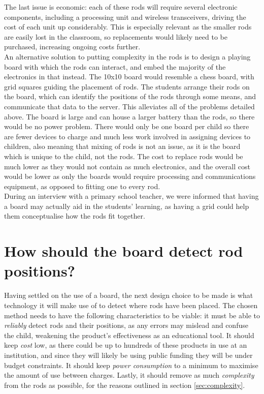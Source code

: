 The last issue is economic: each of these rods will require several electronic components, including a processing unit and wireless transceivers, driving the cost of each unit up considerably. This is especially relevant as the smaller rods are easily lost in the classroom, so replacements would likely need to be purchased, increasing ongoing costs further.\\

An alternative solution to putting complexity in the rods is to design a playing board with which the rods can interact, and embed the majority of the electronics in that instead. The 10x10 board would resemble a chess board, with grid squares guiding the placement of rods. The students arrange their rods on the board, which can identify the positions of the rods through some means, and communicate that data to the server. This alleviates all of the problems detailed above. The board is large and can house a larger battery than the rods, so there would be no power problem. There would only be one board per child so there are fewer devices to charge and much less work involved in assigning devices to children, also meaning that mixing of rods is not an issue, as it is the board which is unique to the child, not the rods. The cost to replace rods would be much lower as they would not contain as much electronics, and the overall cost would be lower as only the boards would require processing and communications equipment, as opposed to fitting one to every rod.\\ 

During an interview with a primary school teacher, we were informed that having a board may actually aid in the students’ learning, as having a grid could help them conceptualise how the rods fit together. 

\section{How should the board detect rod positions?}
\label{sec:detection}  


Having settled on the use of a board, the next design choice to be made is what technology it will make use of to detect where rods have been placed. The chosen method needs to have the following characteristics to be viable: it must be able to \textit{reliably} detect rods and their positions, as any errors may mislead and confuse the child, weakening the product’s effectiveness as an educational tool. It should keep \textit{cost} low, as there could be up to hundreds of these products in use at an institution, and since they will likely be using public funding they will be under budget constraints. It should keep \textit{power consumption} to a minimum to maximise the amount of use between charges. Lastly, it should remove as much \textit{complexity} from the rods as possible, for the reasons outlined in section \ref{sec:complexity}.\\

